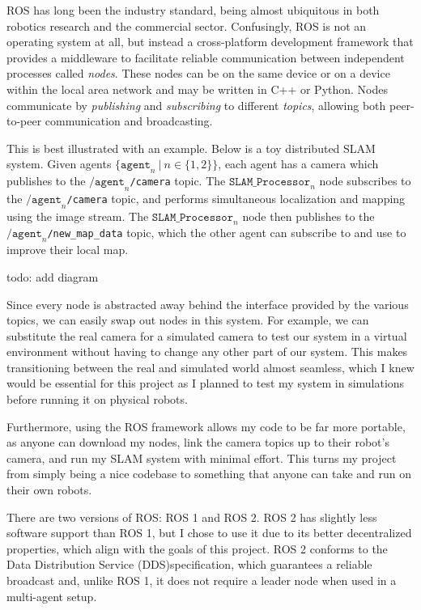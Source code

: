 ROS has long been the industry standard, being almost ubiquitous in both robotics research and the commercial sector. Confusingly, ROS is not an operating system at all, but instead a cross-platform development framework that provides a middleware to facilitate reliable communication between independent processes called \textit{nodes}. These nodes can be on the same device or on a device within the local area network and may be written in C++ or Python. Nodes communicate by \textit{publishing} and \textit{subscribing} to different \textit{topics}, allowing both peer-to-peer communication and broadcasting.

This is best illustrated with an example. Below is a toy distributed SLAM system. Given agents $\{ \texttt{agent}_n \ | \ n \in \{1, 2\} \}$, each agent has a camera which publishes to the $\texttt{/agent}_n$\verb|/camera| topic. The $\texttt{SLAM\_Processor}_n$ node subscribes to the $\texttt{/agent}_n$\verb|/camera| topic, and performs simultaneous localization and mapping using the image stream. The $\texttt{SLAM\_Processor}_n$ node then publishes to the $\texttt{/agent}_n$\verb|/new_map_data| topic, which the other agent can subscribe to and use to improve their local map.

todo: add diagram

Since every node is abstracted away behind the interface provided by the various topics, we can easily swap out nodes in this system. For example, we can substitute the real camera for a simulated camera to test our system in a virtual environment without having to change any other part of our system. This makes transitioning between the real and simulated world almost seamless, which I knew would be essential for this project as I planned to test my system in simulations before running it on physical robots.

Furthermore, using the ROS framework allows my code to be far more portable, as anyone can download my nodes, link the camera topics up to their robot's camera, and run my SLAM system with minimal effort. This turns my project from simply being a nice codebase to something that anyone can take and run on their own robots.

There are two versions of ROS: ROS 1 and ROS 2. ROS 2 has slightly less software support than ROS 1, but I chose to use it due to its better decentralized properties, which align with the goals of this project. ROS 2 conforms to the Data Distribution Service (DDS)\footnotemark[1] specification, which guarantees a reliable broadcast and, unlike ROS 1, it does not require a leader node when used in a multi-agent setup.

